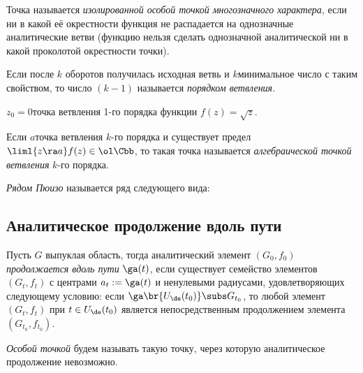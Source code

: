 \documentclass[a4paper]{article}
\begin{document}
\begin{theorem}
\begin{df}
Точка называется \emph{изолированной особой точкой многозначного характера}, если ни в какой её окрестности функция не
распадается на однозначные аналитические ветви ( функцию нельзя сделать однозначной аналитической ни в какой
проколотой окрестности точки).

Если после $k$ оборотов получилась исходная ветвь и $k$\т минимальное число с таким свойством,
то число $(k-1)$ называется \emph{порядком ветвления}.
\end{df}

\begin{ex}
$z_0=0$\т точка ветвления 1-го порядка функции $f(z)=\sqrt{z}$.
\end{ex}

\begin{df}
Если $a$\т  точка ветвления  $k$-го порядка и существует предел $\liml{z\ra a} f(z) \in \ol \Cbb$,
то такая точка называется \emph{алгебраической точкой ветвления} $k$-го порядка.
\end{df}

\begin{df}
\emph{Рядом Пюизо} называется ряд следующего вида:
\end{df}

\begin{ex}
\end{ex}

\subsection{Аналитическое продолжение вдоль пути}

\begin{df}
Пусть $G$ выпуклая область, тогда аналитический элемент $(G_0,f_0)$ \emph{продолжается
вдоль пути} $\ga(t)$, если существует семейство элементов $(G_t,f_t)$ с центрами $a_t := \ga(t)$ и ненулевыми
радиусами, удовлетворяющих следующему условию: если $\ga\br{U_\de(t_0)} \subs G_{t_0}$, то любой элемент $(G_t,f_t)$ при
$t \in U_\de(t_0)$ является непосредственным продолжением элемента $(G_{t_0},f_{t_0})$.
\end{df}

\begin{df}
\emph{Особой точкой} будем называть такую точку, через которую аналитическое продолжение невозможно.
\end{df}


\end{theorem}
\end{document}

